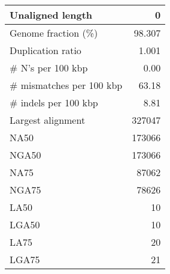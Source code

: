 \documentclass[12pt,a4paper]{article}
\begin{document}
\begin{table}[ht]
\begin{center}
\begin{tabular}{|l*{1}{|r}|}
Unaligned length & 0 \\ \hline
Genome fraction (\%) & 98.307 \\ \hline
Duplication ratio & 1.001 \\ \hline
\# N's per 100 kbp & 0.00 \\ \hline
\# mismatches per 100 kbp & 63.18 \\ \hline
\# indels per 100 kbp & 8.81 \\ \hline
Largest alignment & 327047 \\ \hline
NA50 & 173066 \\ \hline
NGA50 & 173066 \\ \hline
NA75 & 87062 \\ \hline
NGA75 & 78626 \\ \hline
LA50 & 10 \\ \hline
LGA50 & 10 \\ \hline
LA75 & 20 \\ \hline
LGA75 & 21 \\ \hline
\end{tabular}
\end{center}
\end{table}
\end{document}
